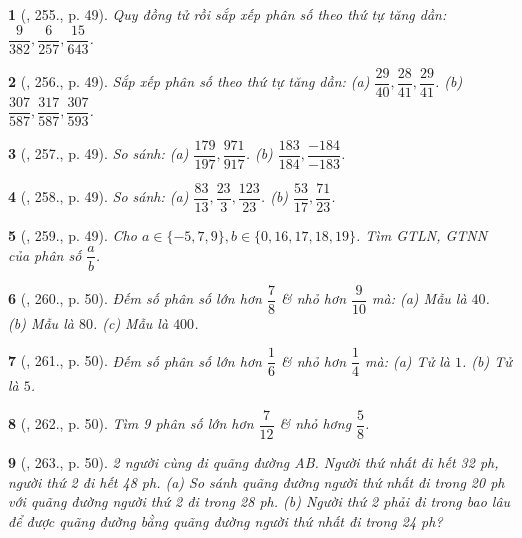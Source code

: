 \documentclass{article}
\newtheorem{baitoan}{}
\begin{document}
\begin{baitoan}[\cite{Tuyen_Toan_6}, 255., p. 49]
	Quy đồng tử rồi sắp xếp phân số theo thứ tự tăng dần: $\dfrac{9}{382},\dfrac{6}{257},\dfrac{15}{643}$.
\end{baitoan}

\begin{baitoan}[\cite{Tuyen_Toan_6}, 256., p. 49]
	Sắp xếp phân số theo thứ tự tăng dần: (a) $\dfrac{29}{40},\dfrac{28}{41},\dfrac{29}{41}$. (b) $\dfrac{307}{587},\dfrac{317}{587},\dfrac{307}{593}$.
\end{baitoan}

\begin{baitoan}[\cite{Tuyen_Toan_6}, 257., p. 49]
	So sánh: (a) $\dfrac{179}{197},\dfrac{971}{917}$. (b) $\dfrac{183}{184},\dfrac{-184}{-183}$.
\end{baitoan}

\begin{baitoan}[\cite{Tuyen_Toan_6}, 258., p. 49]
	So sánh: (a) $\dfrac{83}{13},\dfrac{23}{3},\dfrac{123}{23}$. (b) $\dfrac{53}{17},\dfrac{71}{23}$.
\end{baitoan}

\begin{baitoan}[\cite{Tuyen_Toan_6}, 259., p. 49]
	Cho $a\in\{-5,7,9\},b\in\{0,16,17,18,19\}$. Tìm {\rm GTLN, GTNN} của phân số $\dfrac{a}{b}$.
\end{baitoan}

\begin{baitoan}[\cite{Tuyen_Toan_6}, 260., p. 50]
	Đếm số phân số lớn hơn $\dfrac{7}{8}$ \& nhỏ hơn $\dfrac{9}{10}$ mà: (a) Mẫu là $40$. (b) Mẫu là $80$. (c) Mẫu là $400$.
\end{baitoan}

\begin{baitoan}[\cite{Tuyen_Toan_6}, 261., p. 50]
	Đếm số phân số lớn hơn $\dfrac{1}{6}$ \& nhỏ hơn $\dfrac{1}{4}$ mà: (a) Tử là $1$. (b) Tử là $5$.
\end{baitoan}

\begin{baitoan}[\cite{Tuyen_Toan_6}, 262., p. 50]
	Tìm 9 phân số lớn hơn $\dfrac{7}{12}$ \& nhỏ hơng $\dfrac{5}{8}$.
\end{baitoan}

\begin{baitoan}[\cite{Tuyen_Toan_6}, 263., p. 50]
	2 người cùng đi quãng đường AB. Người thứ nhất đi hết {\rm32 ph}, người thứ 2 đi hết {\rm48 ph}. (a) So sánh quãng đường người thứ nhất đi trong {\rm20 ph} với quãng đường người thứ 2 đi trong {\rm28 ph}. (b) Người thứ 2 phải đi trong bao lâu để được quãng đường bằng quãng đường người thứ nhất đi trong {\rm24 ph}?
\end{baitoan}
\end{document}
